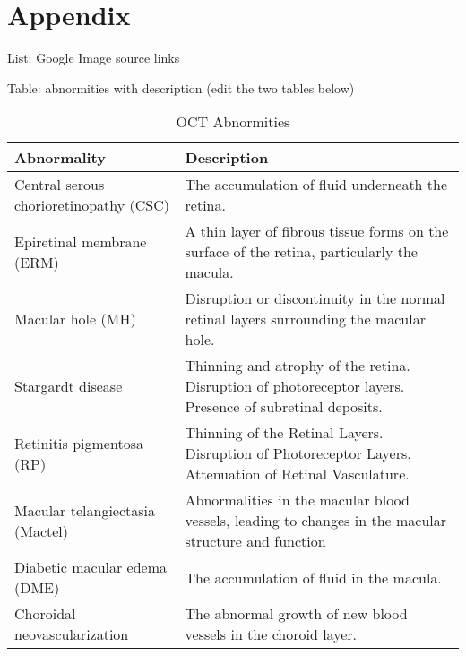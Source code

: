 \documentclass{article}
\begin{document}
	\newrefcontext[sorting=nyt]
	\printbibliography
	
	\pagebreak
	\section*{Appendix}
	
	List: Google Image source links
	
	Table: abnormities with description (edit the two tables below)
	
	{
		\fontsize{9}{12}\selectfont
		{
			\begin{longtable}{lp{3.8in}}
				\caption{OCT Abnormities}
				\label{tb:oct-abnormites}\\
				\toprule
				Abnormality&Description\\
				\toprule
				
				\multicolumn{1}{l}{Central serous chorioretinopathy (CSC)}
				& \multicolumn{1}{l}{The accumulation of fluid underneath the retina.}\\
				
				\multicolumn{1}{l}{Epiretinal membrane (ERM)}
				& A thin layer of fibrous tissue forms on the surface of the retina, particularly the macula.\\
				
				\multicolumn{1}{l}{Macular hole (MH)}
				& Disruption or discontinuity in the normal retinal layers surrounding the macular hole.\\
				
				\multicolumn{1}{l}{Stargardt disease}
				& Thinning and atrophy of the retina. Disruption of photoreceptor layers. Presence of subretinal deposits.\\
				
				\multicolumn{1}{l}{Retinitis pigmentosa (RP)}
				& Thinning of the Retinal Layers. Disruption of Photoreceptor Layers. Attenuation of Retinal Vasculature.\\
				
				\multicolumn{1}{l}{Macular telangiectasia (Mactel)}
				& Abnormalities in the macular blood vessels, leading to changes in the macular structure and function\\
				
				\multicolumn{1}{l}{Diabetic macular edema (DME)}
				& The accumulation of fluid in the macula. \\
				
				\multicolumn{1}{l}{Choroidal neovascularization}
				& The abnormal growth of new blood vessels in the choroid layer.\\
				

\end{longtable}}}
\end{document}
